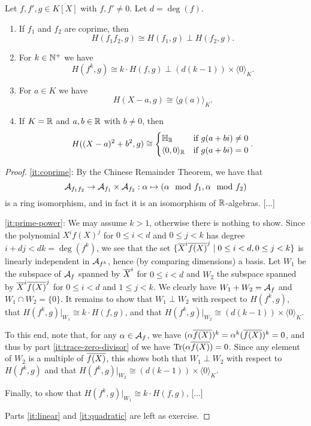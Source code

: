 \documentclass[12pt, leqno, british]{amsart}
\begin{document}
\begin{lem}\label{L:Hermite-properties}
Let $f, f', g \in K[X]$ with $f, f' \neq 0$.
Let $d = \deg(f)$.
\begin{enumerate}
\item\label{it:coprime} If $f_1$ and $f_2$ are coprime, then
$$ H(f_1f_2, g) \cong H(f_1, g) \perp H(f_2, g).$$
\item\label{it:prime-power} For $k \in \mathbb N^+$ we have
$$ H(f^k, g) \cong k \cdot H(f, g) \perp (d(k-1)) \times \langle 0 \rangle_K.$$
\item\label{it:linear} For $a \in K$ we have
$$ H(X - a, g) \cong \langle g(a) \rangle_K.$$
\item\label{it:quadratic} If $K = \mathbb R$ and $a, b \in \mathbb R$ with $b \neq 0$, then
$$ H((X-a)^2 + b^2, g) \cong \begin{cases}
\mathbb{H}_\mathbb R &\text{if } g(a+bi) \neq 0 \\
\langle 0, 0 \rangle_\mathbb R &\text{if } g(a+bi) = 0
\end{cases}.$$
\end{enumerate}
\end{lem}
\begin{proof}
\eqref{it:coprime}: By the Chinese Remainder Theorem, we have that $$ \mathcal{A}_{f_1f_2} \to \mathcal{A}_{f_1} \times \mathcal{A}_{f_2} : \alpha \mapsto (\alpha \mod f_1, \alpha \mod f_2) $$
is a ring isomorphism, and in fact it is an isomorphism of $\mathbb R$-algebras. [...]

\eqref{it:prime-power}: We may assume $k > 1$, otherwise there is nothing to show. 
Since the polynomial $X^i f(X)^j$ for $0 \leq i < d$ and $0 \leq j < k$ has degree $i + dj < dk = \deg(f^k)$, we see that the set $\lbrace \overline{X}^i \overline{f(X)}^j \mid 0 \leq i < d, 0 \leq j < k \rbrace$ is linearly independent in $\mathcal{A}_{f^k}$, hence (by comparing dimensions) a basis.
Let $W_1$ be the subspace of $\mathcal{A}_f$ spanned by $\overline{X}^i$ for $0 \leq i < d$ and $W_2$ the subspace spanned by $\overline{X}^i\overline{f(X)}^j$ for $0 \leq i < d$ and $1 \leq j < k$.
We clearly have $W_1 + W_2 = \mathcal{A}_f$ and $W_1 \cap W_2 = \lbrace 0 \rbrace$.
It remains to show that $W_1 \perp W_2$ with respect to $H(f^k, g)$, that $H(f^k, g)\vert_{W_1} \cong k \cdot H(f, g)$, and that $H(f^k, g)\vert_{W_2} \cong (d(k-1)) \times \langle 0 \rangle_K$.

To this end, note that, for any $\alpha \in \mathcal{A}_f$, we have $(\alpha \overline{f(X)})^{k} = \alpha^k (\overline{f(X)})^k = 0$, and thus by part \eqref{it:trace-zero-divisor} of  we have $\operatorname{Tr}(\alpha\overline{f(X)}) = 0$.
Since any element of $W_2$ is a multiple of $\overline{f(X)}$, this shows both that $W_1 \perp W_2$ with respect to $H(f^k, g)$ and that $H(f^k, g)\vert_{W_2} \cong (d(k-1)) \times \langle 0 \rangle_K$.

Finally, to show that $H(f^k, g)\vert_{W_1} \cong k \cdot H(f, g)$, [...]

Parts \eqref{it:linear} and \eqref{it:quadratic} are left as exercise.
\end{proof}
\end{document}

